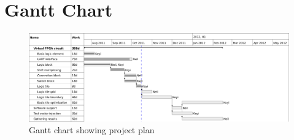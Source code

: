\section{Gantt Chart}

\begin{figure}[!h]
	\centering
	\includegraphics[scale=0.8]{gantt.png}
	\caption{Gantt chart showing project plan}
	\label{gantt-chart}
\end{figure}

